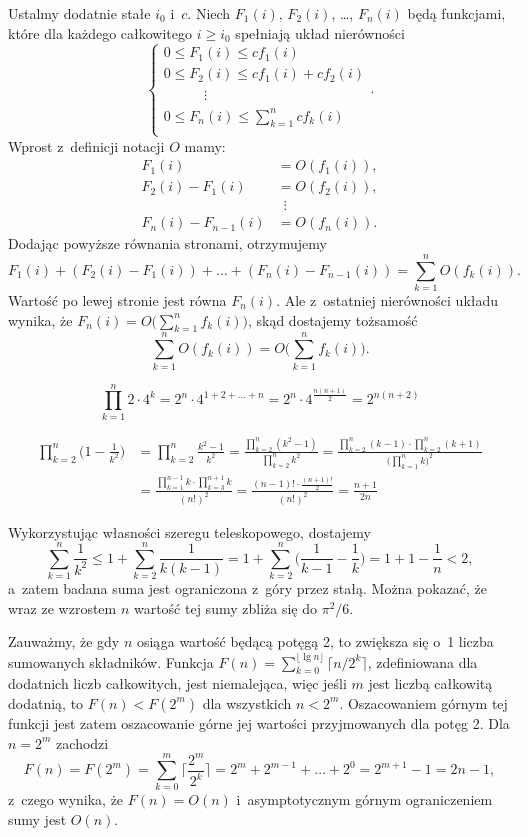 Ustalmy dodatnie stałe $i_0$ i~$c$.
Niech $F_1(i)$, $F_2(i)$, \dots, $F_n(i)$ będą funkcjami, które dla każdego całkowitego $i\ge i_0$ spełniają układ nierówności
\[
	\begin{cases}
		0 \le F_1(i) \le cf_1(i) \\
		0 \le F_2(i) \le cf_1(i)+cf_2(i) \\
		\phantom{0 \le F_2} \vdots \\
		0 \le F_n(i) \le \sum_{k=1}^ncf_k(i) \\
	\end{cases}.
\]
Wprost z~definicji notacji $O$ mamy:
\begin{align*}
	F_1(i) &= O(f_1(i)), \\
	F_2(i)-F_1(i) &= O(f_2(i)), \\
	& \,\,\,\vdots \\
	F_n(i)-F_{n-1}(i) &= O(f_n(i)).
\end{align*}
Dodając powyższe równania stronami, otrzymujemy
\[
	F_1(i)+(F_2(i)-F_1(i))+\dots+(F_n(i)-F_{n-1}(i)) = \sum_{k=1}^nO(f_k(i)).
\]
Wartość po lewej stronie jest równa $F_n(i)$.
Ale z~ostatniej nierówności układu wynika, że $F_n(i)=O\bigl(\sum_{k=1}^nf_k(i)\bigr)$, skąd dostajemy tożsamość
\[
	\sum_{k=1}^nO(f_k(i)) = O\biggl(\sum_{k=1}^nf_k(i)\biggr).
\]

\exercise %
\[
	\prod_{k=1}^n2\cdot4^k = 2^n\cdot4^{1+2+\dots+n} = 2^n\cdot4^{\frac{n(n+1)}{2}} = 2^{n(n+2)}
\]

\exercise %
\begin{align*}
	\prod_{k=2}^n\biggl(1-\frac{1}{k^2}\biggr) &= \prod_{k=2}^n\frac{k^2-1}{k^2} = \frac{\prod_{k=2}^n(k^2-1)}{\prod_{k=2}^nk^2} = \frac{\prod_{k=2}^n(k-1)\cdot\prod_{k=2}^n(k+1)}{\bigl(\prod_{k=1}^nk\bigr)^2} \\[2mm]
	&= \frac{\prod_{k=1}^{n-1}k\cdot\prod_{k=3}^{n+1}k}{(n!)^2} = \frac{(n-1)!\cdot\frac{(n+1)!}{2}}{(n!)^2} = \frac{n+1}{2n}
\end{align*}


\exercise %
Wykorzystując własności szeregu teleskopowego, dostajemy
\[
	\sum_{k=1}^n\frac{1}{k^2} \le 1+\sum_{k=2}^n\frac{1}{k(k-1)} = 1+\sum_{k=2}^n\biggl(\frac{1}{k-1}-\frac{1}{k}\biggr) = 1+1-\frac{1}{n} < 2,
\]
a~zatem badana suma jest ograniczona z~góry przez stałą.
Można pokazać, że wraz ze wzrostem $n$ wartość tej sumy zbliża się do $\pi^2\!/6$.

\exercise %
Zauważmy, że gdy $n$ osiąga wartość będącą potęgą 2, to zwiększa się o~1 liczba sumowanych składników.
Funkcja $F(n)=\sum_{k=0}^{\lfloor\lg n\rfloor}\bigl\lceil n/2^k\bigr\rceil$, zdefiniowana dla dodatnich liczb całkowitych, jest niemalejąca, więc jeśli $m$ jest liczbą całkowitą dodatnią, to $F(n)<F(2^m)$ dla wszystkich $n<2^m$.
Oszacowaniem górnym tej funkcji jest zatem oszacowanie górne jej wartości przyjmowanych dla potęg 2.
Dla $n=2^m$ zachodzi
\[
	F(n) = F(2^m) = \sum_{k=0}^m\biggl\lceil\frac{2^m}{2^k}\biggr\rceil = 2^m+2^{m-1}+\dots+2^0 = 2^{m+1}-1 = 2n-1,
\]
z~czego wynika, że $F(n)=O(n)$ i~asymptotycznym górnym ograniczeniem sumy jest $O(n)$.

